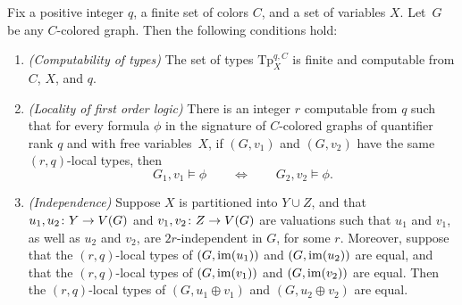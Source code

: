 \begin{proposition}\label{pro:gaifman}
	Fix a positive integer $q$, a finite set of colors $C$, and a set of variables $X$. Let~$G$ be any $C$-colored graph. Then the following conditions hold:
 \begin{enumerate}[(1)]
 	\item \emph{(Computability of types)} The set of types $\mathrm{Tp}^{q,C}_X$ is finite and computable from $C$, $X$, and $q$.

	\item \emph{(Locality of first order logic)} There is an integer $r$ computable from $q$ such that for every formula $\phi$ in the signature of $C$-colored graphs  
	of quantifier rank $q$ and with free variables~$X$,	
  if $(G,v_1)$ and $(G,v_2)$ have the same $(r,q)$-local types,
	then
	 $$G_1,v_1\models \phi\qquad\iff \qquad G_2,v_2\models \phi.$$



	 \item \emph{(Independence)} Suppose $X$ is partitioned into $Y\cup Z$, 
	 and that $u_1,u_2\colon Y\to V(G)$ and $v_1,v_2\colon Z\to V(G)$ are valuations
   such that  $u_1$ and $v_1$, as well as $u_2$ and $v_2$,
   are $2r$-independent in $G$, for some $r$.
   Moreover, suppose that the $(r,q)$-local types of $(G,\mathrm{im}(u_1))$ and $(G,\mathrm{im}(u_2))$ are equal,
   and that the $(r,q)$-local types of $(G,\mathrm{im}(v_1))$ and $(G,\mathrm{im}(v_2))$ are equal.
   Then the $(r,q)$-local types of $(G,u_1\oplus v_1)$ and $(G,u_2\oplus v_2)$ are equal.
 \end{enumerate}
\end{proposition}


